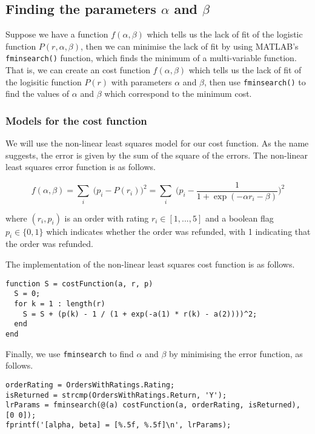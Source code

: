 \subsection{Finding the parameters $\alpha$ and $\beta$}
Suppose we have a function $f(\alpha, \beta)$ which tells us the lack of fit of the logistic function $P(r, \alpha, \beta)$, then we can minimise the lack of fit by using MATLAB's \lstinline|fminsearch()| function, which finds the minimum of a multi-variable function. That is, we can create an cost function $f(\alpha, \beta)$ which tells us the lack of fit of the logisitic function $P(r)$ with parameters $\alpha$ and $\beta$, then use \lstinline|fminsearch()| to find the values of $\alpha$ and $\beta$ which correspond to the minimum cost.

\subsubsection{Models for the cost function}
We will use the non-linear least squares model for our cost function. As the name suggests, the error is given by the sum of the square of the errors. The non-linear least squares error function is as follows.

$$f(\alpha, \beta) = \sum_i \; \Big(p_i - P(r_i)\Big)^2 = \sum_i \; \Bigg(p_i - \frac{1}{1 + \exp(-\alpha r_i - \beta)}\Bigg)^2$$

\noindent
where $(r_i, p_i)$ is an order with rating $r_i \in [1, ..., 5]$ and a boolean flag $p_i \in \{0, 1\}$ which indicates whether the order was refunded, with 1 indicating that the order was refunded.

\noindent
The implementation of the non-linear least squares cost function is as follows.

\begin{lstlisting}
function S = costFunction(a, r, p)
  S = 0;
  for k = 1 : length(r)
    S = S + (p(k) - 1 / (1 + exp(-a(1) * r(k) - a(2))))^2;
  end
end
\end{lstlisting}

\noindent
Finally, we use \lstinline|fminsearch| to find $\alpha$ and $\beta$ by minimising the error function, as follows.

\begin{lstlisting}
orderRating = OrdersWithRatings.Rating;
isReturned = strcmp(OrdersWithRatings.Return, 'Y');
lrParams = fminsearch(@(a) costFunction(a, orderRating, isReturned), [0 0]);
fprintf('[alpha, beta] = [%.5f, %.5f]\n', lrParams); 
\end{lstlisting}

